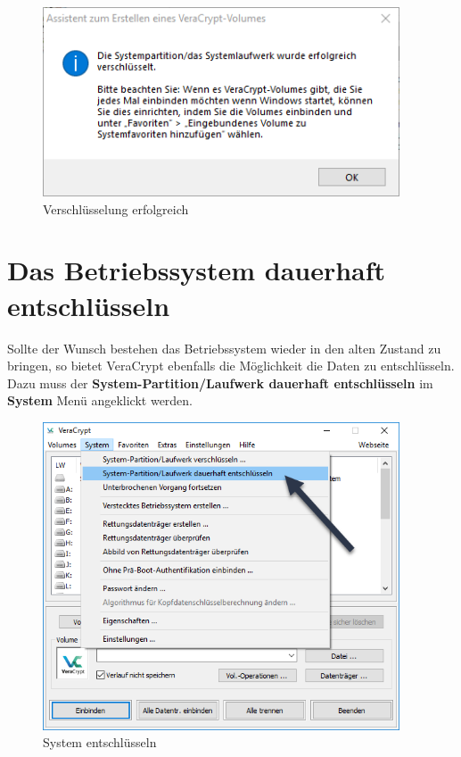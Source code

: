 \documentclass[12pt,a4paper]{scrreprt}
\begin{document}
\begin{figure}[h]
\begin{center}
\includegraphics[width=300pt]{media/systemsuccess.png}
\caption{Verschlüsselung erfolgreich}
\label{systemsuccess}
\end{center}
\end{figure}

\newpage

\section{Das Betriebssystem dauerhaft entschlüsseln}
Sollte der Wunsch bestehen das Betriebssystem wieder in den alten Zustand zu bringen, so bietet VeraCrypt ebenfalls die Möglichkeit die Daten zu entschlüsseln. Dazu muss der \textbf{System-Partition/Laufwerk dauerhaft entschlüsseln} im \textbf{System} Menü angeklickt werden.

\begin{figure}[h]
\begin{center}
\includegraphics[width=300pt]{media/systemdecrypt1.png}
\caption{System entschlüsseln}
\label{systemdecrypt1}
\end{center}
\end{figure}
\end{document}
